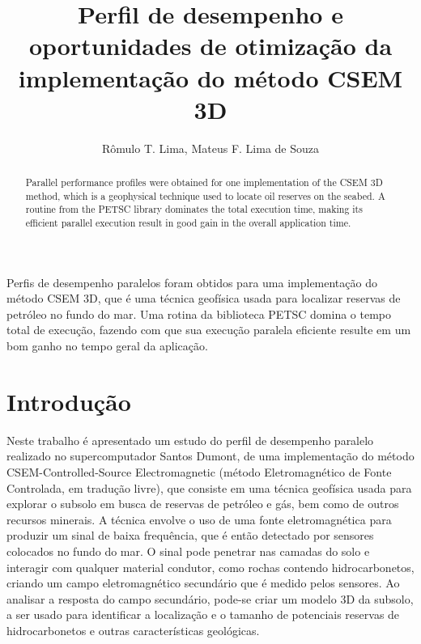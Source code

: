 \documentclass[12pt]{article}
\title{Perfil de desempenho e oportunidades de otimização da implementação do método CSEM 3D}
\author{Rômulo T. Lima\inst{1,2}, Mateus F. Lima de Souza\inst{1,3}}
\begin{document}
 

\maketitle

\begin{abstract}
Parallel performance profiles were obtained for one implementation of the CSEM 3D method, which is a geophysical technique used to locate oil reserves on the seabed. A routine from the PETSC library dominates the total execution time, making its efficient parallel execution result in good gain in the overall application time.
\end{abstract}
     
\begin{resumo} 
Perfis de desempenho paralelos foram obtidos para uma implementação do método CSEM 3D, que é uma técnica geofísica usada para localizar reservas de petróleo no fundo do mar. Uma rotina da biblioteca PETSC domina o tempo total de execução, fazendo com que sua execução paralela eficiente resulte em um bom ganho no tempo geral da aplicação. 
\end{resumo}


\section{Introdução}
\label{sec:intro}
%
Neste trabalho é apresentado um estudo do perfil de desempenho paralelo realizado no supercomputador Santos Dumont, de uma implementação do método CSEM-Controlled-Source Electromagnetic (método Eletromagnético de Fonte Controlada, em tradução livre)\cite{zerilli2014broadband,zerilli2016broadband}, que consiste em uma técnica geofísica usada para explorar o subsolo em busca de reservas de petróleo e gás, bem como de outros recursos minerais. A técnica envolve o uso de uma fonte eletromagnética para produzir um sinal de baixa frequência, que é então detectado por sensores colocados no fundo do mar. O sinal pode penetrar nas camadas do solo e interagir com qualquer material condutor, como rochas contendo hidrocarbonetos, criando um campo eletromagnético secundário que é medido pelos sensores. Ao analisar a resposta do campo secundário, pode-se criar um modelo 3D da subsolo, a ser usado para identificar a localização e o tamanho de potenciais reservas de hidrocarbonetos e outras características geológicas.
\end{document}
